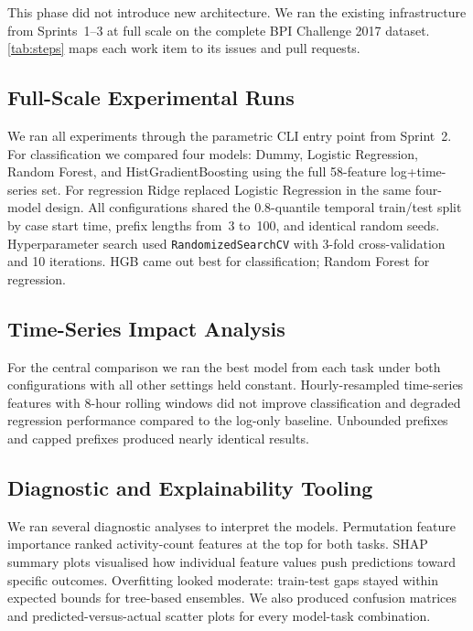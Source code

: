 \documentclass[runningheads]{llncs}
\begin{document}
This phase did not introduce new architecture. We ran the existing
infrastructure from Sprints~1--3 at full scale on the complete BPI Challenge
2017 dataset. \autoref{tab:steps} maps each work item
to its issues and pull requests.

\subsection{Full-Scale Experimental Runs}
We ran all experiments through the parametric CLI entry point from Sprint~2.
For classification we compared four models: Dummy, Logistic Regression, Random Forest,
and HistGradientBoosting using the full 58-feature log+time-series set. For regression
Ridge replaced Logistic Regression in the same four-model design. All
configurations shared the 0.8-quantile temporal train/test split by case start time, prefix
lengths from~3 to~100, and identical random seeds. Hyperparameter search used
\texttt{RandomizedSearchCV} with 3-fold cross-validation and 10 iterations. HGB came out
best for classification; Random Forest for regression.

\subsection{Time-Series Impact Analysis}
For the central comparison we ran the best model from each task under both configurations
with all other settings held constant. Hourly-resampled time-series features with
8-hour rolling windows did not improve classification and degraded regression
performance compared to the log-only baseline. Unbounded prefixes and capped prefixes
produced nearly identical results.

\subsection{Diagnostic and Explainability Tooling}
We ran several diagnostic analyses to interpret the models. Permutation feature
importance ranked activity-count features at the top for both tasks. SHAP summary plots
visualised how individual feature values push predictions toward specific outcomes.
Overfitting looked moderate: train-test gaps stayed within expected bounds for tree-based
ensembles. We also produced confusion matrices and predicted-versus-actual scatter plots
for every model-task combination.
\end{document}
